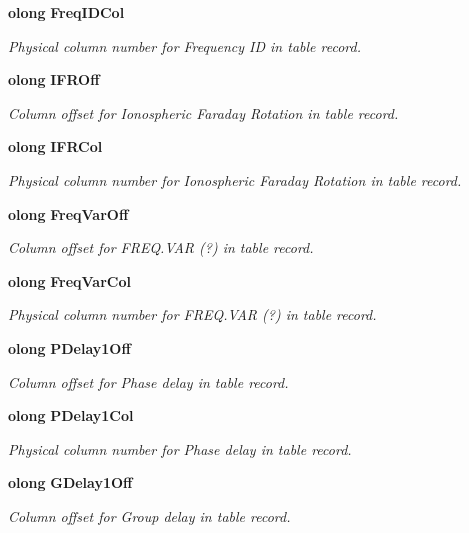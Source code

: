 \begin{CompactItemize}
{\bf olong} {\bf Freq\-IDCol}
\begin{CompactList}\small\item\em Physical column number for Frequency ID in table record. \item\end{CompactList}\item 
{\bf olong} {\bf IFROff}
\begin{CompactList}\small\item\em Column offset for Ionospheric Faraday Rotation in table record. \item\end{CompactList}\item 
{\bf olong} {\bf IFRCol}
\begin{CompactList}\small\item\em Physical column number for Ionospheric Faraday Rotation in table record. \item\end{CompactList}\item 
{\bf olong} {\bf Freq\-Var\-Off}
\begin{CompactList}\small\item\em Column offset for FREQ.VAR (?) in table record. \item\end{CompactList}\item 
{\bf olong} {\bf Freq\-Var\-Col}
\begin{CompactList}\small\item\em Physical column number for FREQ.VAR (?) in table record. \item\end{CompactList}\item 
{\bf olong} {\bf PDelay1Off}
\begin{CompactList}\small\item\em Column offset for Phase delay in table record. \item\end{CompactList}\item 
{\bf olong} {\bf PDelay1Col}
\begin{CompactList}\small\item\em Physical column number for Phase delay in table record. \item\end{CompactList}\item 
{\bf olong} {\bf GDelay1Off}
\begin{CompactList}\small\item\em Column offset for Group delay in table record. \item\end{CompactList}\item 

\end{CompactItemize}
